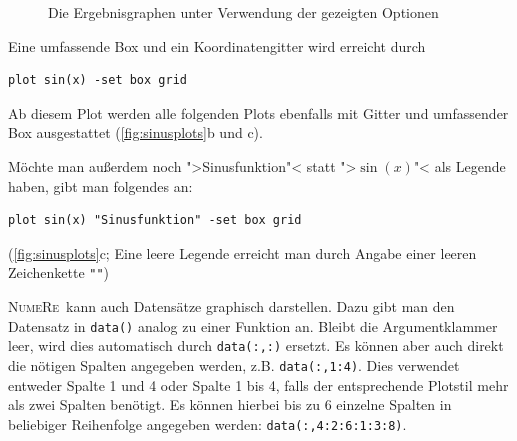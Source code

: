 \documentclass[DIV=14,headsepline,footsepline]{scrbook}
\newcommand{\NR}{\textsc{Nu\-me\-Re}}
\begin{document}
\begin{figure}[p]
					\caption{Die Ergebnisgraphen unter Verwendung der gezeigten Optionen}
					\label{fig:sinusplots}
				\end{figure}
				
				Eine umfassende Box und ein Koordinatengitter wird erreicht durch
				\begin{lstlisting}
plot sin(x) -set box grid
				\end{lstlisting}
				Ab diesem Plot werden alle folgenden Plots ebenfalls mit Gitter und umfassender Box ausgestattet (\autoref{fig:sinusplots}b und c).
				
				Möchte man außerdem noch ">Sinusfunktion"< statt ">$\sin(x)$"< als Legende haben, gibt man folgendes an:
				\begin{lstlisting}
plot sin(x) "Sinusfunktion" -set box grid
				\end{lstlisting}
				(\autoref{fig:sinusplots}c; Eine leere Legende erreicht man durch Angabe einer leeren Zeichenkette \verb+""+)
				
				\NR\ kann auch Datensätze graphisch darstellen. Dazu gibt man den Datensatz in \verb+data()+ analog zu einer Funktion an. Bleibt die Argumentklammer leer, wird dies automatisch durch \verb+data(:,:)+ ersetzt. Es können aber auch direkt die nötigen Spalten angegeben werden, z.B. \verb+data(:,1:4)+. Dies verwendet entweder Spalte 1 und 4 oder Spalte 1 bis 4, falls der entsprechende Plotstil mehr als zwei Spalten benötigt. Es können hierbei bis zu 6 einzelne Spalten in beliebiger Reihenfolge angegeben werden: \verb+data(:,4:2:6:1:3:8)+.
				
\end{document}
